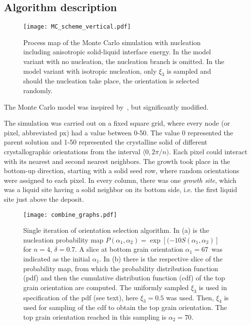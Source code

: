 \subsection{Algorithm description}
\begin{figure}
	\centering
	\texttt{[image: MC\_scheme\_vertical.pdf]}
	\caption[Process map of the Monte Carlo simulation with nucleation including anisotropic solid-liquid interface energy]{Process map of the Monte Carlo simulation with nucleation including anisotropic solid-liquid interface energy. In the model variant with no nucleation, the nucleation branch is omitted. In the model variant with isotropic nucleation, only $\xi_3$ is sampled and should the nucleation take place, the orientation is selected randomly.}
	\label{fig_MCscheme}
\end{figure}

The Monte Carlo model was inspired by~\cite{Li1997_1,Li1997_2}, but significantly modified. 

The simulation was carried out on a fixed square grid, where every node (or pixel, abbreviated px) had a value between 0-50. The value 0 represented the parent solution and 1-50 represented the crystalline solid of different crystallographic orientations from the interval $\langle0,2\pi/n)$. Each pixel could interact with its nearest and second nearest neighbors. The growth took place in the bottom-up direction, starting with a solid seed row, where random orientations were assigned to each pixel. In every column, there was one \textit{growth site}, which was a liquid site having a solid neighbor on its bottom side, i.e. the first liquid site just above the deposit.

\begin{figure}
	\centering
	\texttt{[image: combine\_graphs.pdf]}
	\caption[Single iteration of orientation selection algorithm]{Single iteration of orientation selection algorithm. In (a) is the nucleation probability map $P(\alpha_1,\alpha_2)=\exp[(-10S(\alpha_1,\alpha_2)]$ for $n=4$, $\delta=0.7$. A slice at bottom grain orientation $\alpha_1=67$\textdegree~was indicated as the initial $\alpha_1$. In (b) there is the respective slice of the probability map, from which the probability distribution function (pdf) and then the cumulative distribution function (cdf) of the top grain orientation are computed. The uniformly sampled $\xi_3$ is used in specification of the pdf (see text), here $\xi_3=0.5$ was used. Then, $\xi_4$ is used for sampling of the cdf to obtain the top grain orientation. The top grain orientation reached in this sampling is $\alpha_2=70$\textdegree.}
	\label{fig_MC_orientation_selection}
\end{figure}

